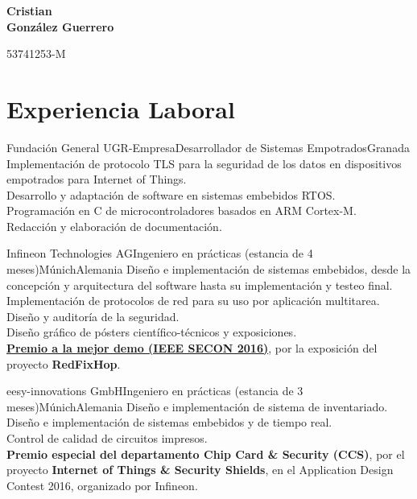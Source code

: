 \documentclass[11pt,a4paper,sans,spanish]{moderncv}
\begin{document}
\begin{minipage}[c]{\textwidth-110pt-0.2em}
    \begin{flushright}
        \textbf{\Huge{Cristian\\\vspace{4pt}González Guerrero}}

        \vspace{4pt}
        \small{53741253-M}
    \end{flushright}
\end{minipage}
\vspace{-5em}

\makecvtitle

\section{Experiencia Laboral}

{Fundación General UGR-Empresa}{Desarrollador de Sistemas Empotrados}{Granada}{}
{Implementación de protocolo TLS para la seguridad de los datos en dispositivos empotrados para Internet of Things.\\
Desarrollo y adaptación de software en sistemas embebidos RTOS.\\
Programación en C de microcontroladores basados en ARM Cortex-M.\\
Redacción y elaboración de documentación.\\
}

{Infineon Technologies AG}{Ingeniero en prácticas (estancia de 4 meses)}{Múnich}{Alemania}
{Diseño e implementación de sistemas embebidos, desde la concepción y arquitectura del software hasta su implementación y testeo final.\\
Implementación de protocolos de red para su uso por aplicación multitarea.\\
Diseño y auditoría de la seguridad.\\
Diseño gráfico de pósters científico-técnicos y exposiciones.\\
\href{http://secon2016.ieee-secon.org/content/demos-session}{\textbf{Premio a la mejor demo (IEEE SECON 2016)}}, por la exposición del proyecto \textbf{RedFixHop}.
}

{eesy-innovations GmbH}{Ingeniero en prácticas (estancia de 3 meses)}{Múnich}{Alemania}
{Diseño e implementación de sistema de inventariado.\\
Diseño e implementación de sistemas embebidos y de tiempo real.\\
Control de calidad de circuitos impresos.\\
\textbf{Premio especial del departamento Chip Card \& Security (CCS)}, por el proyecto \textbf{Internet of Things \& Security Shields}, en el Application Design Contest 2016, organizado por Infineon.}
\end{document}
